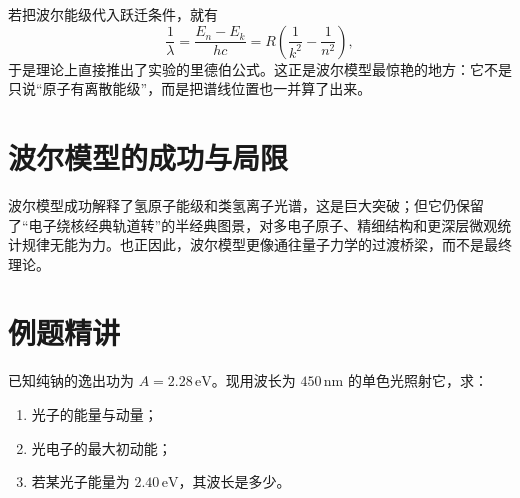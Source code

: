 \documentclass[lang=cn,11pt]{elegantbook}
\begin{document}
\begin{center}
\end{center}

\begin{remark}
若把波尔能级代入跃迁条件，就有
\[
\frac{1}{\lambda}=\frac{E_n-E_k}{hc}
=R\left(\frac{1}{k^2}-\frac{1}{n^2}\right),
\]
于是理论上直接推出了实验的里德伯公式。这正是波尔模型最惊艳的地方：它不是只说“原子有离散能级”，而是把谱线位置也一并算了出来。
\end{remark}

\section{波尔模型的成功与局限}

波尔模型成功解释了氢原子能级和类氢离子光谱，这是巨大突破；但它仍保留了“电子绕核经典轨道转”的半经典图景，对多电子原子、精细结构和更深层微观统计规律无能为力。也正因此，波尔模型更像通往量子力学的过渡桥梁，而不是最终理论。

\section{例题精讲}

\begin{example}[450\,nm 单色光照射纯钠时会发生什么]
已知纯钠的逸出功为 \(A=2.28\,\mathrm{eV}\)。现用波长为 \(450\,\mathrm{nm}\) 的单色光照射它，求：
\begin{enumerate}
  \item 光子的能量与动量；
  \item 光电子的最大初动能；
  \item 若某光子能量为 \(2.40\,\mathrm{eV}\)，其波长是多少。
\end{enumerate}
\end{example}
\end{document}
